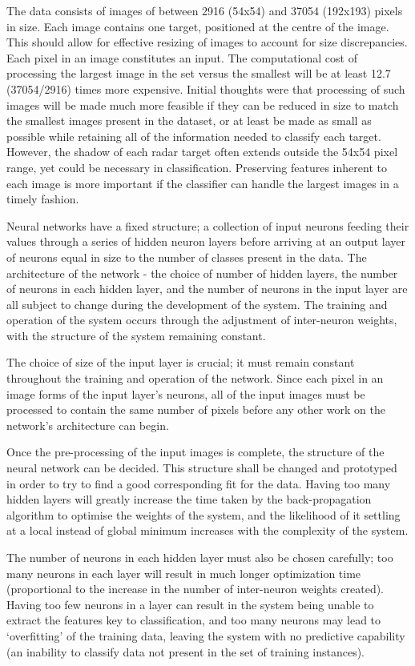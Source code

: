 The data consists of images of between 2916 (54x54) and 37054 (192x193) pixels in size. Each image contains one target, positioned at the centre of the image. This should allow for effective resizing of images to account for size discrepancies. Each pixel in an image constitutes an input. The computational cost of processing the largest image in the set versus the smallest will be at least 12.7 (37054/2916) times more expensive. Initial thoughts were that processing of such images will be made much more feasible if they can be reduced in size to match the smallest images present in the dataset, or at least be made as small as possible while retaining all of the information needed to classify each target. However, the shadow of each radar target often extends outside the 54x54 pixel range, yet could be necessary in classification. Preserving features inherent to each image is more important if the classifier can handle the largest images in a timely fashion. 

Neural networks have a fixed structure; a collection of input neurons feeding their values through a series of hidden neuron layers before arriving at an output layer of neurons equal in size to the number of classes present in the data. The architecture of the network - the choice of number of hidden layers, the number of neurons in each hidden layer, and the number of neurons in the input layer are all subject to change during the development of the system. The training and operation of the system occurs through the adjustment of inter-neuron weights, with the structure of the system remaining constant.

The choice of size of the input layer is crucial; it must remain constant throughout the training and operation of the network. Since each pixel in an image forms of the input layer's neurons, all of the input images must be processed to contain the same number of pixels before any other work on the network's architecture can begin. 

Once the pre-processing of the input images is complete, the structure of the neural network can be decided. This structure shall be changed and prototyped in order to try to find a good corresponding fit for the data. Having too many hidden layers will greatly increase the time taken by the back-propagation algorithm to optimise the weights of the system, and the likelihood of it settling at a local instead of global minimum increases with the complexity of the system. 

The number of neurons in each hidden layer must also be chosen carefully; too many neurons in each layer will result in much longer optimization time (proportional to the increase in the number of inter-neuron weights created). Having too few neurons in a layer can result in the system being unable to extract the features key to classification, and too many neurons may lead to `overfitting' of the training data, leaving the system with no predictive capability (an inability to classify data not present in the set of training instances).


